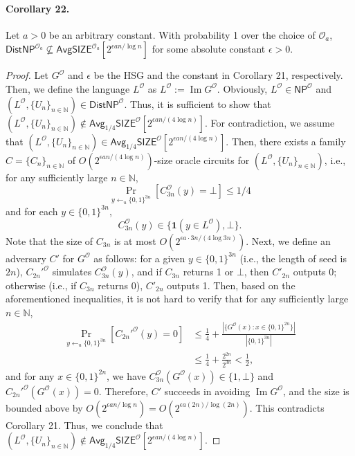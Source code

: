 \documentclass[10pt,a4paper]{article}
\begin{document}
\paragraph{Corollary 22.}
Let $a>0$ be an arbitrary constant. With probability 1 over the choice of $\mathcal O_a$, $\mathsf{DistNP}^{\mathcal O_a}\not\subseteq\mathsf{AvgSIZE}^{\mathcal O_a}[2^{\epsilon an/\log n}]$ for some absolute constant $\epsilon>0$.
\begin{proof}
Let $G^{\mathcal O}$ and $\epsilon$ be the HSG and the constant in Corollary 21, respectively. Then, we define the language $L^{\mathcal O}$ as $L^{\mathcal O}:=\operatorname{Im}G^{\mathcal O}$. Obviously, $L^{\mathcal O}\in\mathsf{NP}^{\mathcal O}$ and $(L^{\mathcal O},\{U_n\}_{n\in\mathbb N})\in\mathsf{DistNP}^{\mathcal O}$. Thus, it is sufficient to show that $(L^{\mathcal O},\{U_n\}_{n\in\mathbb N})\notin\mathsf{Avg}_{1/4}\mathsf{SIZE}^{\mathcal O}[2^{\epsilon an/(4\log n)}]$.
For contradiction, we assume that $(L^{\mathcal O},\{U_n\}_{n\in\mathbb N})\in\mathsf{Avg}_{1/4}\mathsf{SIZE}^{\mathcal O}[2^{\epsilon an/(4\log n)}]$. Then, there exists a family $C=\{C_n\}_{n\in\mathbb N}$ of $O(2^{\epsilon an/(4\log n)})$-size oracle circuits for $(L^{\mathcal O},\{U_n\}_{n\in\mathbb N})$, i.e., for any sufficiently large $n\in\mathbb N$,
\[\Pr_{y\leftarrow_u\{0,1\}^{3n}}[C_{3n}^{\mathcal O}(y)=\bot]\leq1/4\]
and for each $y\in\{0,1\}^{3n}$,
\[C_{3n}^{\mathcal O}(y)\in\{\mathbf1(y\in L^{\mathcal O}),\bot\}.\]
Note that the size of $C_{3n}$ is at most $O(2^{\epsilon a\cdot3n/(4\log3n)})$.
Next, we define an adversary $C'$ for $G^{\mathcal O}$ as follows: for a given $y\in\{0,1\}^{3n}$ (i.e., the length of seed is $2n$), $C_{2n}'^{\mathcal O}$ simulates $C_{3n}^{\mathcal O}(y)$, and if $C_{3n}$ returns 1 or $\bot$, then $C'_{2n}$ outputs 0; otherwise (i.e., if $C_{3n}$ returns 0), $C'_{2n}$ outputs 1. Then, based on the aforementioned inequalities, it is not hard to verify that for any sufficiently large $n\in\mathbb N$,
\begin{align*}
\Pr_{y\leftarrow_u\{0,1\}^{3n}}[C_{2n}'^{\mathcal O}(y)=0]
&\leq\frac14+\frac{|\{G^{\mathcal O}(x):x\in\{0,1\}^{2n}\}|}{|\{0,1\}^{3n}|}\\
&\leq\frac14+\frac{2^{2n}}{2^{3n}}<\frac12,
\end{align*}
and for any $x\in\{0,1\}^{2n}$, we have $C_{3n}^{\mathcal O}(G^{\mathcal O}(x))\in\{1,\bot\}$ and $C_{2n}'^{\mathcal O}(G^{\mathcal O}(x))=0$.
Therefore, $C'$ succeeds in avoiding $\operatorname{Im}G^{\mathcal O}$, and the size is bounded above by $O(2^{\epsilon an/\log n})=O(2^{\epsilon a(2n)/\log(2n)})$. This contradicts Corollary 21. Thus, we conclude that $(L^{\mathcal O},\{U_n\}_{n\in\mathbb N})\notin\mathsf{Avg}_{1/4}\mathsf{SIZE}^{\mathcal O}[2^{\epsilon an/(4\log n)}]$.
\end{proof}
\end{document}
